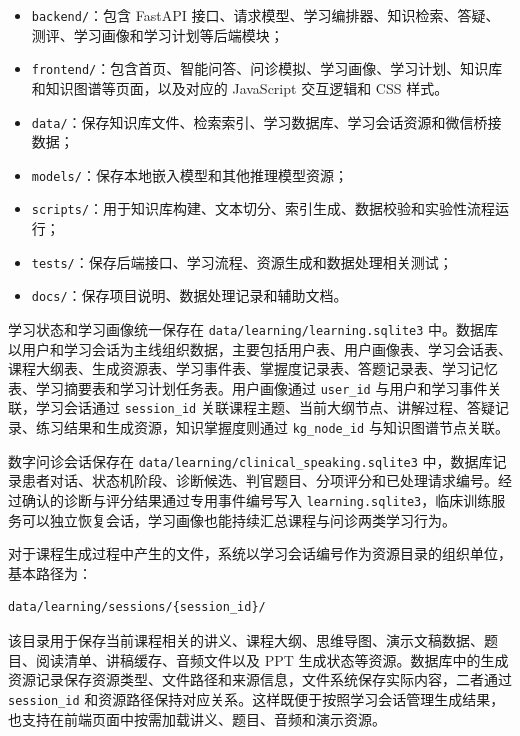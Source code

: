 \begin{itemize}
  \item \texttt{backend/}：包含 FastAPI 接口、请求模型、学习编排器、知识检索、答疑、测评、学习画像和学习计划等后端模块；
  \item \texttt{frontend/}：包含首页、智能问答、问诊模拟、学习画像、学习计划、知识库和知识图谱等页面，以及对应的 JavaScript 交互逻辑和 CSS 样式。
  \item \texttt{data/}：保存知识库文件、检索索引、学习数据库、学习会话资源和微信桥接数据；
  \item \texttt{models/}：保存本地嵌入模型和其他推理模型资源；
  \item \texttt{scripts/}：用于知识库构建、文本切分、索引生成、数据校验和实验性流程运行；
  \item \texttt{tests/}：保存后端接口、学习流程、资源生成和数据处理相关测试；
  \item \texttt{docs/}：保存项目说明、数据处理记录和辅助文档。
\end{itemize}

学习状态和学习画像统一保存在 \texttt{data/learning/learning.sqlite3} 中。数据库以用户和学习会话为主线组织数据，主要包括用户表、用户画像表、学习会话表、课程大纲表、生成资源表、学习事件表、掌握度记录表、答题记录表、学习记忆表、学习摘要表和学习计划任务表。用户画像通过 \texttt{user\_id} 与用户和学习事件关联，学习会话通过 \texttt{session\_id} 关联课程主题、当前大纲节点、讲解过程、答疑记录、练习结果和生成资源，知识掌握度则通过 \texttt{kg\_node\_id} 与知识图谱节点关联。

数字问诊会话保存在 \texttt{data/learning/clinical\_speaking.sqlite3} 中，数据库记录患者对话、状态机阶段、诊断候选、判官题目、分项评分和已处理请求编号。经过确认的诊断与评分结果通过专用事件编号写入 \texttt{learning.sqlite3}，临床训练服务可以独立恢复会话，学习画像也能持续汇总课程与问诊两类学习行为。

对于课程生成过程中产生的文件，系统以学习会话编号作为资源目录的组织单位，基本路径为：

\begin{lstlisting}
data/learning/sessions/{session_id}/
\end{lstlisting}

该目录用于保存当前课程相关的讲义、课程大纲、思维导图、演示文稿数据、题目、阅读清单、讲稿缓存、音频文件以及 PPT 生成状态等资源。数据库中的生成资源记录保存资源类型、文件路径和来源信息，文件系统保存实际内容，二者通过 \texttt{session\_id} 和资源路径保持对应关系。这样既便于按照学习会话管理生成结果，也支持在前端页面中按需加载讲义、题目、音频和演示资源。


